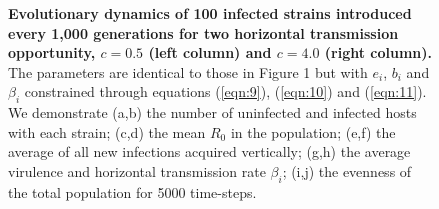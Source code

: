 \begin{figure}[tbp]
    \medskip
    \hfil
        
    \medskip
    \hfil
\caption{\textbf{Evolutionary dynamics of 100 infected strains introduced every 1,000 generations for two horizontal transmission opportunity, $c = 0.5$ (left column) and $c = 4.0$ (right column).} The parameters are identical to those in Figure 1 but with $e_i$, $b_i$ and $\beta_i$ constrained through equations (\ref{eqn:9}), (\ref{eqn:10}) and (\ref{eqn:11}). We demonstrate (a,b) the number of uninfected and infected hosts with each strain; (c,d) the mean $R_0$ in the population; (e,f) the average of all new infections acquired vertically; (g,h) the average virulence and horizontal transmission rate $\beta_i$; (i,j) the evenness of the total population for 5000 time-steps.
}
    \label{fig:SF2}
\end{figure}

